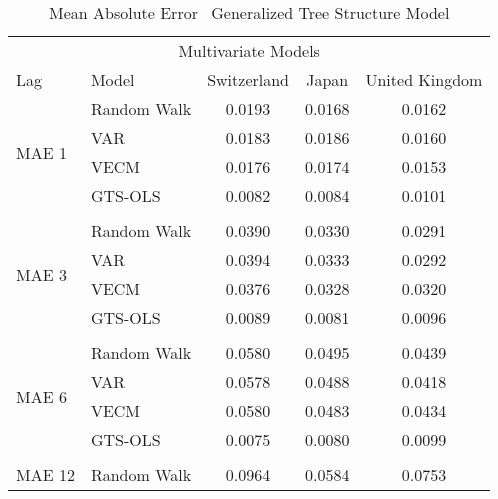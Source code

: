 \begin{table}[!h] %
  \centering
    \caption{Mean Absolute Error \textendash \ Generalized Tree Structure Model}
  \begin{tabular}{llccc} %
    \toprule
    \multicolumn{5}{c}{Multivariate Models}                      \\
    \cmidrule(r){1-5}
    Lag                           &   Model                                     &Switzerland  & Japan     & United Kingdom\\
    \midrule
    \multirow{4}{*}{MAE 1}        & \multicolumn{1}{l}{Random Walk}             &   0.0193  & 0.0168  & 0.0162 \\  
                                  & \multicolumn{1}{l}{VAR}                     &   0.0183  & 0.0186  & 0.0160 \\ 
                                  & \multicolumn{1}{l}{VECM}                    &   0.0176  & 0.0174  & 0.0153 \\
                                  & \multicolumn{1}{l}{GTS-OLS}                 &   0.0082  & 0.0084  & 0.0101 \\    
    \\
    \multirow{4}{*}{MAE 3}        & \multicolumn{1}{l}{Random Walk}             &   0.0390  & 0.0330  & 0.0291 \\ 
                                  & \multicolumn{1}{l}{VAR}                     &   0.0394  & 0.0333  & 0.0292 \\
                                  & \multicolumn{1}{l}{VECM}                    &   0.0376  & 0.0328  & 0.0320 \\
                                  & \multicolumn{1}{l}{GTS-OLS}                 &   0.0089  & 0.0081  & 0.0096 \\
    \\
    \multirow{4}{*}{MAE 6}        & \multicolumn{1}{l}{Random Walk}             &   0.0580  & 0.0495  & 0.0439 \\
                                  & \multicolumn{1}{l}{VAR}                     &   0.0578  & 0.0488  & 0.0418 \\
                                  & \multicolumn{1}{l}{VECM}                    &   0.0580  & 0.0483  & 0.0434 \\
                                  & \multicolumn{1}{l}{GTS-OLS}                 &   0.0075  & 0.0080  & 0.0099 \\    
     \\
    \multirow{4}{*}{MAE 12}       & \multicolumn{1}{l}{Random Walk}             &   0.0964  & 0.0584  & 0.0753 \\

\end{tabular}
\end{table}
